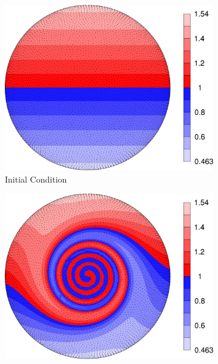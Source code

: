 \documentclass{report}
\begin{document}
\begin{figure}
\begin{center}
\begin{subfigure}[b]{0.49\textwidth}
	\centering
	\includegraphics[width=1.0\textwidth]{../figures/paper1/figures/vortex_rollup/vortexInitialCondition-eps-converted-to.pdf}
	\caption{Initial Condition}
	\label{fig:vortex_initial}
\end{subfigure} 
\begin{subfigure}[b]{0.49\textwidth}
	\centering
	\includegraphics[width=1.0\textwidth]{../figures/paper1/figures/vortex_rollup/vortexComputedSolution-eps-converted-to.pdf}

\end{subfigure}
\end{center}
\end{figure}
\end{document}
